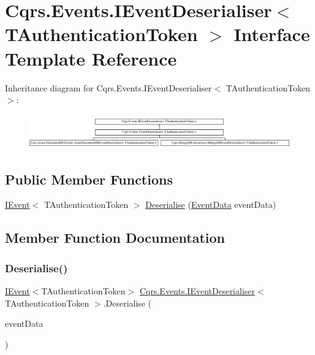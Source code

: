 \hypertarget{interfaceCqrs_1_1Events_1_1IEventDeserialiser}{}\section{Cqrs.\+Events.\+I\+Event\+Deserialiser$<$ T\+Authentication\+Token $>$ Interface Template Reference}
\label{interfaceCqrs_1_1Events_1_1IEventDeserialiser}
Inheritance diagram for Cqrs.\+Events.\+I\+Event\+Deserialiser$<$ T\+Authentication\+Token $>$\+:\begin{figure}[H]
\begin{center}
\leavevmode
\includegraphics[height=1.508079cm]{interfaceCqrs_1_1Events_1_1IEventDeserialiser}
\end{center}
\end{figure}
\subsection*{Public Member Functions}
\begin{DoxyCompactItemize}
\item 
\hyperlink{interfaceCqrs_1_1Events_1_1IEvent}{I\+Event}$<$ T\+Authentication\+Token $>$ \hyperlink{interfaceCqrs_1_1Events_1_1IEventDeserialiser_af9216046631ed941bb96b58a0cc27f22}{Deserialise} (\hyperlink{classCqrs_1_1Events_1_1EventData}{Event\+Data} event\+Data)
\end{DoxyCompactItemize}


\subsection{Member Function Documentation}
\mbox{\label{interfaceCqrs_1_1Events_1_1IEventDeserialiser_af9216046631ed941bb96b58a0cc27f22}} 
\subsubsection{\texorpdfstring{Deserialise()}{Deserialise()}}
{\footnotesize\ttfamily \hyperlink{interfaceCqrs_1_1Events_1_1IEvent}{I\+Event}$<$T\+Authentication\+Token$>$ \hyperlink{interfaceCqrs_1_1Events_1_1IEventDeserialiser}{Cqrs.\+Events.\+I\+Event\+Deserialiser}$<$ T\+Authentication\+Token $>$.Deserialise (\begin{DoxyParamCaption}\item[{\hyperlink{classCqrs_1_1Events_1_1EventData}{Event\+Data}}]{event\+Data }\end{DoxyParamCaption})}



